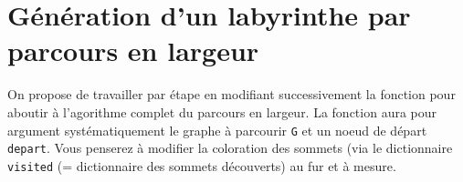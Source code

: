 





\section*{Génération d'un labyrinthe par parcours en largeur}


On propose de travailler par étape en modifiant successivement la fonction pour aboutir à l'agorithme complet du parcours en largeur.
La fonction aura pour argument systématiquement le graphe à parcourir \lstinline{G} et un noeud de départ \lstinline{depart}. Vous penserez à modifier la coloration des sommets (via le dictionnaire \lstinline{visited} (= dictionnaire des sommets découverts) au fur et à mesure.

